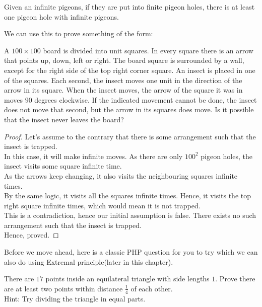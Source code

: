 \begin{theorem}
Given an infinite pigeons, if they are put into finite pigeon holes, there is at least one pigeon hole with infinite pigeons.
\end{theorem}
We can use this to prove something of the form:\\
\begin{example}
    A $100\times100$ board is divided into unit squares. In every square there is an arrow that points up, down, left or right. The board square is surrounded by a wall, except for the right side of the top right corner square. An insect is placed in one of the squares. Each second, the insect moves one unit in the direction of the arrow in its square. When the insect moves, the arrow of the square it was in moves $90$ degrees clockwise. If the indicated movement cannot be done, the insect does not move that second, but the arrow in its squares does move. Is it possible that the insect never leaves the board?
\end{example}
\begin{proof}
    Let's assume to the contrary that there is some arrangement such that the insect is trapped.\\
    In this case, it will make infinite moves. As there are only $100^2$ pigeon holes, the insect visits some square infinite time.\\
    As the arrows keep changing, it also visits the neighbouring squares infinite times.\\
    By the same logic, it visits all the squares infinite times. Hence, it visits the top right square infinite times, which would mean it is not trapped.\\
    This is a contradiction, hence our initial assumption is false. There exists no such arrangement such that the insect is trapped.\\
    Hence, proved.
\end{proof}
Before we move ahead, here is a classic PHP question for you to try which we can also do using Extremal principle(later in this chapter).\\
\begin{example}
    There are $17$ points inside an equilateral triangle with side lengths $1$. Prove there are at least
two points within distance $\frac{1}{4}$ of each other.\\
Hint: Try dividing the triangle in equal parts.
\end{example}
